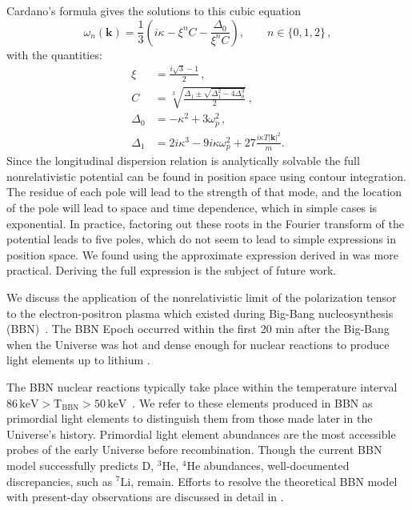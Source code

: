 Cardano's formula gives the solutions to this cubic equation
\begin{equation}\label{eq:cardano}
\omega_n(\boldsymbol{k}) = \frac{1}{3}\left(i\kappa-\xi^n C-\frac{\Delta_0}{\xi^n C}\right), \qquad n \in \{0,1,2\} \,,
\end{equation}
with the quantities:
\begin{align}\label{eq:delta}
  \xi &=\frac{i\sqrt{3}-1}{2}\,,\\
    C &= \sqrt[3]{\frac{\Delta_1 \pm \sqrt{\Delta_1^2 - 4 \Delta_0^3}}2}\,,\\
    \Delta_0 &= -\kappa^2 + 3 \omega_p^2\,,\\
\Delta_1 &= 2i\kappa^3 - 9 i\kappa \omega_p^2 + 27\frac{i\kappa T |\boldsymbol{k}|^2}{m}.
\end{align}
Since the longitudinal dispersion relation is analytically solvable the full nonrelativistic potential can be found in position space using contour integration. The residue of each pole will lead to the strength of that mode, and the location of the pole will lead to space and time dependence, which in simple cases is exponential. In practice, factoring out these roots in the Fourier transform of the potential leads to five poles, which do not seem to lead to simple expressions in position space. We found using the approximate expression derived in  was more practical. Deriving the full expression is the subject of future work.


We discuss the application of the nonrelativistic limit of the polarization tensor  to the electron-positron plasma which existed during Big-Bang nucleosynthesis (BBN)~\cite{Grayson:2023flr}. The BBN Epoch occurred within the first 20 min after the Big-Bang when the Universe was hot and dense enough for nuclear reactions to produce light elements up to lithium \cite{Pitrou:2018cgg}. 

The BBN nuclear reactions typically take place within the temperature interval $86\, \mathrm{keV}>\mathrm{T_{BBN}}>50\, \mathrm{keV}$~\cite{Pitrou:2018cgg}. We refer to these elements produced in BBN as primordial light elements to distinguish them from those made later in the Universe's history. Primordial light element abundances are the most accessible probes of the early Universe before recombination. Though the current BBN model successfully predicts D, $^3$He, $^4$He abundances, well-documented discrepancies, such as $^7$Li, remain. Efforts to resolve the theoretical BBN model with present-day observations are discussed in detail in \cite{Pitrou:2021vqr,Bertulani:2022qly}.

